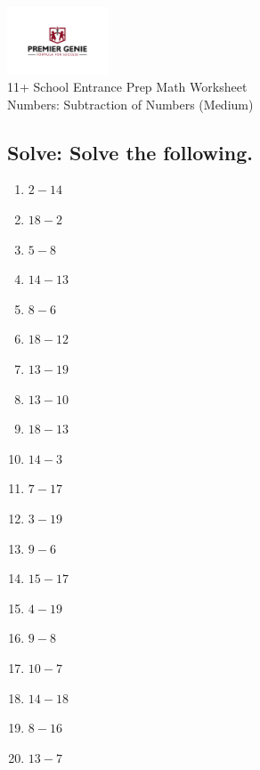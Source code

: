 \documentclass{article}
\begin{document}
\begin{center}
\includegraphics[width=3cm]{PREMGENIEJPG.jpg}\\
{\Large 11+ School Entrance Prep Math Worksheet}\\
{\Medium Numbers: Subtraction of Numbers (Medium)}\\

\end{center}

\subsection*{Solve: Solve the following.}

\begin{enumerate}
\item $\displaystyle {2}-{14} $ \ 
\item $\displaystyle {18}-{2} $ \ 
\item $\displaystyle {5}-{8} $ \ 
\item $\displaystyle {14}-{13} $ \ 
\item $\displaystyle {8}-{6} $ \ 
\item $\displaystyle {18}-{12} $ \ 
\item $\displaystyle {13}-{19} $ \ 
\item $\displaystyle {13}-{10} $ \ 
\item $\displaystyle {18}-{13} $ \ 
\item $\displaystyle {14}-{3} $ \ 
\item $\displaystyle {7}-{17} $ \ 
\item $\displaystyle {3}-{19} $ \ 
\item $\displaystyle {9}-{6} $ \ 
\item $\displaystyle {15}-{17} $ \ 
\item $\displaystyle {4}-{19} $ \ 
\item $\displaystyle {9}-{8} $ \ 
\item $\displaystyle {10}-{7} $ \ 
\item $\displaystyle {14}-{18} $ \ 
\item $\displaystyle {8}-{16} $ \ 
\item $\displaystyle {13}-{7} $ \ 


\end{enumerate}
\end{document}
